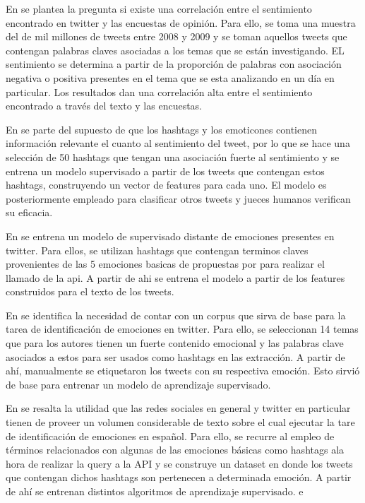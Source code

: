 En \cite{o2010tweets} se plantea la pregunta si existe una correlación entre el sentimiento encontrado en twitter y las encuestas de opinión. Para ello, se toma una muestra del de mil millones de tweets entre 2008 y 2009 y se toman aquellos tweets que contengan palabras claves asociadas a los temas que se están investigando. EL sentimiento se determina a partir de la proporción de palabras con asociación negativa o positiva presentes en el tema que se esta analizando en un día en particular. Los resultados dan una correlación alta entre el sentimiento encontrado a través del texto y las encuestas.

En \cite{davidov2010enhanced} se parte del supuesto de que los hashtags y los emoticones contienen información relevante el cuanto al sentimiento del tweet, por lo que se hace una selección de 50 hashtags que tengan una asociación fuerte al sentimiento y se entrena un modelo supervisado a partir de los tweets que contengan estos hashtags, construyendo un vector de features para cada uno. El modelo es posteriormente empleado para clasificar otros tweets y jueces humanos verifican su eficacia.


En  \cite{wang2012harnessing} se entrena un modelo de supervisado distante de emociones presentes en twitter. Para ellos, se utilizan hashtags que contengan terminos claves provenientes de las 5 emociones basicas de propuestas por \cite{ekman1993facial} para realizar el llamado de la api. A partir de ahi se entrena el modelo a partir de los features construidos para el texto de los tweets. 

En \cite{roberts2012empatweet} se identifica la necesidad de contar con un corpus que sirva de base para la tarea de identificación de emociones en twitter. Para ello, se seleccionan  14 temas que para los autores tienen un fuerte contenido emocional y las palabras clave asociados a estos para ser usados como hashtags en las extracción. A partir de ahí, manualmente se etiquetaron los tweets con su respectiva emoción. Esto sirvió de base para entrenar un modelo de aprendizaje supervisado.

En \cite{gil2013combining} se resalta la utilidad que las redes sociales en general y twitter en particular tienen de proveer un volumen considerable de texto sobre el cual ejecutar la tare de identificación de emociones en español. Para ello, se recurre al empleo de términos relacionados con algunas de las emociones básicas como hashtags ala hora de realizar la query a la API y se construye un dataset en donde los tweets que contengan dichos hashtags son pertenecen a determinada emoción. A partir de ahí se entrenan distintos algoritmos de aprendizaje supervisado.  e


